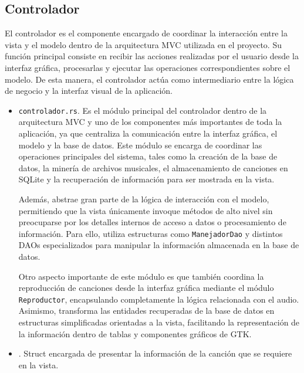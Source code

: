 \documentclass[12pt]{article}
\begin{document}
\subsection{Controlador}

El controlador es el componente encargado de coordinar la interacción entre la vista y el modelo dentro de la arquitectura MVC utilizada en el proyecto. Su función principal consiste en recibir las acciones realizadas por el usuario desde la interfaz gráfica, procesarlas y ejecutar las operaciones correspondientes sobre el modelo. De esta manera, el controlador actúa como intermediario entre la lógica de negocio y la interfaz visual de la aplicación.

\begin{itemize}

\item \texttt{controlador.rs}. Es el módulo principal del controlador dentro de la arquitectura MVC y uno de los componentes más importantes de toda la aplicación, ya que centraliza la comunicación entre la interfaz gráfica, el modelo y la base de datos. Este módulo se encarga de coordinar las operaciones principales del sistema, tales como la creación de la base de datos, la minería de archivos musicales, el almacenamiento de canciones en SQLite y la recuperación de información para ser mostrada en la vista.

Además, abstrae gran parte de la lógica de interacción con el modelo, permitiendo que la vista únicamente invoque métodos de alto nivel sin preocuparse por los detalles internos de acceso a datos o procesamiento de información. Para ello, utiliza estructuras como \texttt{ManejadorDao} y distintos DAOs especializados para manipular la información almacenada en la base de datos.

Otro aspecto importante de este módulo es que también coordina la reproducción de canciones desde la interfaz gráfica mediante el módulo \texttt{Reproductor}, encapsulando completamente la lógica relacionada con el audio. Asimismo, transforma las entidades recuperadas de la base de datos en estructuras simplificadas orientadas a la vista, facilitando la representación de la información dentro de tablas y componentes gráficos de GTK.

\item \texttt{}. Struct encargada de presentar la información de la canción que se requiere en la vista.

\end{itemize}
\end{document}
